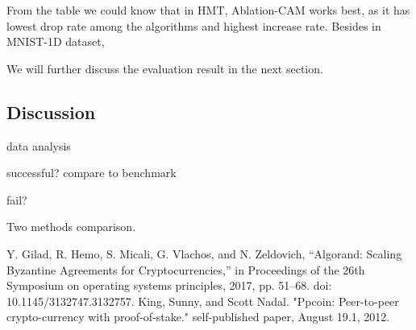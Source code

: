 \documentclass[conference]{IEEEtran}
\begin{document}
From the table we could know that in HMT, Ablation-CAM works best, as it has lowest drop rate among the algorithms and highest increase rate. Besides in MNIST-1D dataset, %
\par
We will further discuss the evaluation result in the next section.

\subsection{Discussion}

data analysis

successful? compare to benchmark

fail?

Two methods comparison.

\begin{thebibliography}{00}
Y. Gilad, R. Hemo, S. Micali, G. Vlachos, and N. Zeldovich, “Algorand: Scaling Byzantine Agreements for Cryptocurrencies,” in Proceedings of the 26th Symposium on operating systems principles, 2017, pp. 51–68. doi: 10.1145/3132747.3132757.
 King, Sunny, and Scott Nadal. "Ppcoin: Peer-to-peer crypto-currency with proof-of-stake." self-published paper, August 19.1, 2012.

\end{thebibliography}
\end{document}
